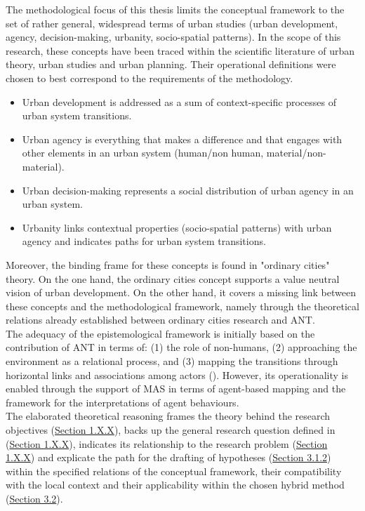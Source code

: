 \documentclass[11pt]{report}
\begin{document}
{{{{The methodological focus of this thesis limits the conceptual framework to the set of rather general, widespread terms of urban studies (urban development, agency, decision-making, urbanity, socio-spatial patterns).
In the scope of this research, these concepts have been traced within the scientific literature of urban theory, urban studies and urban planning. Their operational definitions were chosen to best correspond to the requirements of the methodology.

\begin{itemize}
\item Urban development is addressed as a sum of context-specific processes of urban system transitions.
\item Urban agency is everything that makes a difference and that engages with other elements in an urban system (human/non human, material/non-material).
\item Urban decision-making represents a social distribution of urban agency in an urban system.
\item Urbanity links contextual properties (socio-spatial patterns) with urban agency and indicates paths for urban system transitions.
\end{itemize}

Moreover, the binding frame for these concepts is found in "ordinary cities" theory. On the one hand, the ordinary cities concept supports a value neutral vision of urban development. On the other hand, it covers a missing link between these concepts and the methodological framework, namely through the theoretical relations already established between ordinary cities research and ANT.
\\

The adequacy of the epistemological framework is initially based on the contribution of ANT in terms of:
(1) the role of non-humans,
(2) approaching the environment as a relational process, and
(3) mapping the transitions through horizontal links and associations among actors (\href{Latour}{\citealt{latour_reassembling_2005}}).
However, its operationality is enabled through the support of MAS in terms of agent-based mapping and the framework for the interpretations of agent behaviours. 
\\

The elaborated theoretical reasoning frames the theory behind the research objectives (\href{Section 1.X.X}{Section 1.X.X}), backs up the general research question defined in (\href{Section 1.X.X}{Section 1.X.X}), indicates its relationship to the research problem (\href{Section 1.X.X}{Section 1.X.X}) and explicate the path for the drafting of hypotheses (\href{Section 3.1.2}{Section 3.1.2}) within the specified relations of the conceptual framework, their compatibility with the local context and their applicability within the chosen hybrid method (\href{Section 3.2}{Section 3.2}).

}}}}
\end{document}
